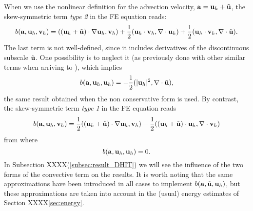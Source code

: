 \begin{remark}
\label{rem-skewsym}
When we use the nonlinear definition for the advection velocity, ${\bf a}={\bf u}_h+\tilde{{\bf u}}$, the skew-symmetric term \textit{type 2}  in the FE equation  reads: 
\begin{equation}
\label{eq-C2_vms_b_skew2_aux1}
b({\bf a},{\bf u}_h,{\bf v}_h)=(({\bf u}_h+\tilde{{\bf u}})\cdot\nabla{\bf u}_h,{\bf v}_h)+\frac{1}{2}({\bf u}_h\cdot{\bf v}_h,\nabla\cdot{\bf u}_h)+\frac{1}{2}({\bf u}_h\cdot{\bf v}_h,\nabla\cdot\tilde{{\bf u}}).
\end{equation}
The last term is not well-defined, since it includes derivatives of the discontinuous subscale $\tilde{{\bf u}}$. One possibility is to neglect it (as previously done with other similar terms when arriving to ), which implies
\begin{equation}
b({\bf a},{\bf u}_h,{\bf u}_h)=-\frac{1}{2}(|{\bf u}_h|^2,\nabla\cdot\tilde{{\bf u}}),
\end{equation}
the same result obtained when the non conservative form is used.
By contrast, the skew-symmetric term \textit{type 1} in the FE equation  reads
\begin{equation}
\label{eq-C2_vms_b_skew1_aux1}
b({\bf a},{\bf u}_h,{\bf v}_h)=\frac{1}{2}(({\bf u}_h+\tilde{{\bf u}})\cdot\nabla{\bf u}_h,{\bf v}_h)-\frac{1}{2}(({\bf u}_h+\tilde{{\bf u}})\cdot{\bf u}_h,\nabla\cdot{\bf v}_h)
\end{equation}
from where
\begin{equation}
b({\bf a},{\bf u}_h,{\bf u}_h)=0.
\end{equation}
In Subsection XXXX(\ref{subsec:result_DHIT}) we will see the influence of the two forms of the convective term on the results.
It is worth noting that the same approximations have been introduced in all cases to implement $b({\bf a},\tilde{{\bf u}},{\bf u}_h)$, but these approximations are taken into account in the (usual) energy estimates of Section XXXX\ref{sec:energy}.
\end{remark}


